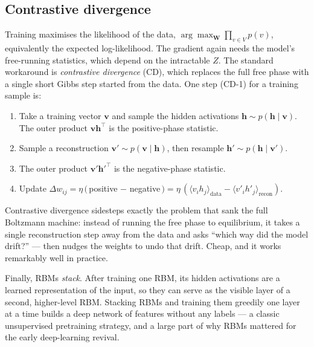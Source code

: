 \documentclass[11pt, oneside]{book}
\newcommand{\T}{^{\top}}
\begin{document}
\subsection*{Contrastive divergence}

Training maximises the likelihood of the data, $\arg\max_{\bm{W}} \prod_{v\in V}
p(v)$, equivalently the expected log-likelihood. The gradient again needs the
model's free-running statistics, which depend on the intractable $Z$. The
standard workaround is \emph{contrastive divergence} (CD), which replaces the
full free phase with a single short Gibbs step started from the data. One step
(CD-1) for a training sample is:
\begin{enumerate}
  \item Take a training vector $\bm{v}$ and sample the hidden activations
        $\bm{h} \sim p(\bm{h}\mid\bm{v})$. The outer product $\bm{v}\bm{h}\T$ is
        the positive-phase statistic.
  \item Sample a reconstruction $\bm{v}' \sim p(\bm{v}\mid\bm{h})$, then resample
        $\bm{h}' \sim p(\bm{h}\mid\bm{v}')$.
  \item The outer product ${\bm{v}'}{\bm{h}'}\T$ is the negative-phase statistic.
  \item Update $\Delta w_{ij} = \eta\,(\,$positive $-$ negative$\,)
        = \eta\,(\langle v_i h_j\rangle_{\text{data}}
        - \langle v'_i h'_j\rangle_{\text{recon}})$.
\end{enumerate}

\begin{intbox}
Contrastive divergence sidesteps exactly the problem that sank the full
Boltzmann machine: instead of running the free phase to equilibrium, it takes a
single reconstruction step away from the data and asks ``which way did the model
drift?'' — then nudges the weights to undo that drift. Cheap, and it works
remarkably well in practice.
\end{intbox}

Finally, RBMs \emph{stack}. After training one RBM, its hidden activations are a
learned representation of the input, so they can serve as the visible layer of a
second, higher-level RBM. Stacking RBMs and training them greedily one layer at a
time builds a deep network of features without any labels — a classic
unsupervised pretraining strategy, and a large part of why RBMs mattered for the
early deep-learning revival.
\end{document}
